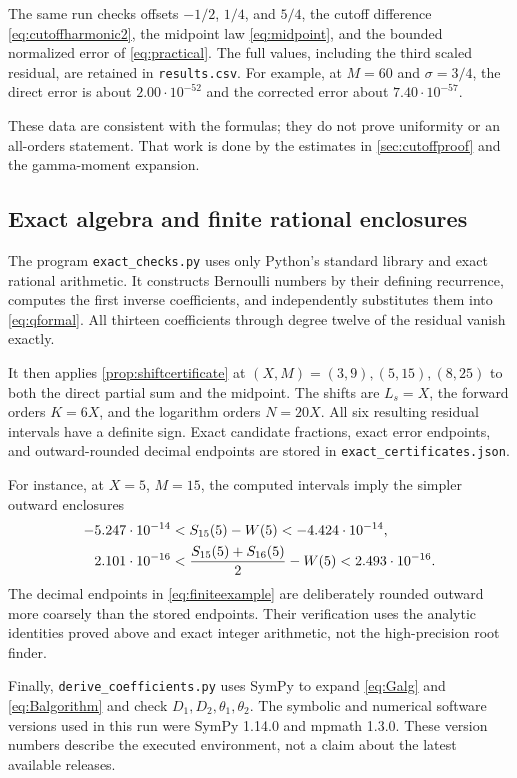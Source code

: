 \documentclass[11pt,a4paper]{article}
\theoremstyle{definition}
\numberwithin{equation}{section}
\begin{document}
The same run checks offsets $-1/2$, $1/4$, and $5/4$, the cutoff difference \eqref{eq:cutoffharmonic2}, the midpoint law \eqref{eq:midpoint}, and the bounded normalized error of \eqref{eq:practical}. The full values, including the third scaled residual, are retained in \texttt{results.csv}. For example, at $M=60$ and $\sigma=3/4$, the direct error is about $2.00\cdot10^{-52}$ and the corrected error about $7.40\cdot10^{-57}$.

These data are consistent with the formulas; they do not prove uniformity or an all-orders statement. That work is done by the estimates in \cref{sec:cutoffproof} and the gamma-moment expansion.

\subsection{Exact algebra and finite rational enclosures}
The program \texttt{exact\_checks.py} uses only Python's standard library and exact rational arithmetic. It constructs Bernoulli numbers by their defining recurrence, computes the first inverse coefficients, and independently substitutes them into \eqref{eq:qformal}. All thirteen coefficients through degree twelve of the residual vanish exactly.

It then applies \cref{prop:shiftcertificate} at $(X,M)=(3,9),(5,15),(8,25)$ to both the direct partial sum and the midpoint. The shifts are $L_s=X$, the forward orders $K=6X$, and the logarithm orders $N=20X$. All six resulting residual intervals have a definite sign. Exact candidate fractions, exact error endpoints, and outward-rounded decimal endpoints are stored in \texttt{exact\_certificates.json}.

For instance, at $X=5$, $M=15$, the computed intervals imply the simpler outward enclosures
\begin{align}
 -5.247\cdot10^{-14}&<S_{15}(5)-W(5)<-4.424\cdot10^{-14},\notag\\
 2.101\cdot10^{-16}&<\frac{S_{15}(5)+S_{16}(5)}2-W(5)
                      <2.493\cdot10^{-16}.
 \label{eq:finiteexample}
\end{align}
The decimal endpoints in \eqref{eq:finiteexample} are deliberately rounded outward more coarsely than the stored endpoints. Their verification uses the analytic identities proved above and exact integer arithmetic, not the high-precision root finder.

Finally, \texttt{derive\_coefficients.py} uses SymPy to expand \eqref{eq:Galg} and \eqref{eq:Balgorithm} and check $D_1,D_2,\theta_1,\theta_2$. The symbolic and numerical software versions used in this run were SymPy 1.14.0 and mpmath 1.3.0. These version numbers describe the executed environment, not a claim about the latest available releases.
\end{document}
